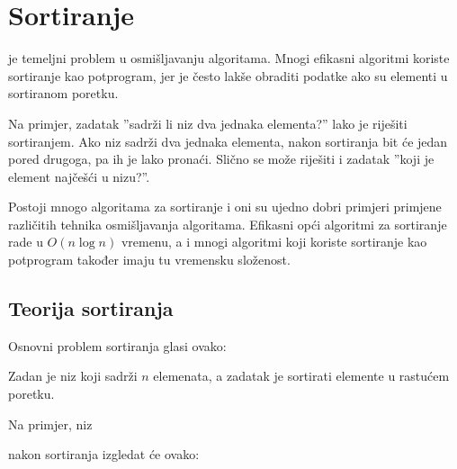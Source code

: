 \chapter{Sortiranje}


je temeljni problem u osmišljavanju algoritama.
Mnogi efikasni algoritmi
koriste sortiranje kao potprogram,
jer je često lakše obraditi
podatke ako su elementi u sortiranom poretku.

Na primjer, zadatak ''sadrži li niz
dva jednaka elementa?'' lako je riješiti sortiranjem.
Ako niz sadrži dva jednaka elementa,
nakon sortiranja bit će jedan pored drugoga,
pa ih je lako pronaći.
Slično se može riješiti i zadatak ''koji je element
najčešći u nizu?''.

Postoji mnogo algoritama za sortiranje i oni su
ujedno dobri primjeri primjene
različitih tehnika osmišljavanja algoritama.
Efikasni opći algoritmi za sortiranje
rade u $O(n \log n)$ vremenu,
a i mnogi algoritmi koji koriste sortiranje
kao potprogram također
imaju tu vremensku složenost.

\section{Teorija sortiranja}

Osnovni problem sortiranja glasi ovako:
\begin{framed}
\noindent
Zadan je niz koji sadrži $n$ elemenata,
a zadatak je sortirati elemente
u rastućem poretku.
\end{framed}
\noindent
Na primjer, niz
\begin{center}
\end{center}
nakon sortiranja izgledat će ovako:
\begin{center}
\end{center}

